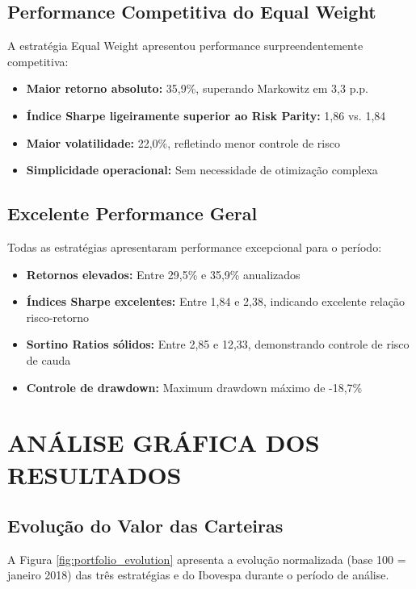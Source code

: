 \subsection{Performance Competitiva do Equal Weight}

A estratégia Equal Weight apresentou performance surpreendentemente competitiva:

\begin{itemize}
    \item \textbf{Maior retorno absoluto:} 35,9\%, superando Markowitz em 3,3 p.p.
    \item \textbf{Índice Sharpe ligeiramente superior ao Risk Parity:} 1,86 vs. 1,84
    \item \textbf{Maior volatilidade:} 22,0\%, refletindo menor controle de risco
    \item \textbf{Simplicidade operacional:} Sem necessidade de otimização complexa
\end{itemize}

\subsection{Excelente Performance Geral}

Todas as estratégias apresentaram performance excepcional para o período:

\begin{itemize}
    \item \textbf{Retornos elevados:} Entre 29,5\% e 35,9\% anualizados
    \item \textbf{Índices Sharpe excelentes:} Entre 1,84 e 2,38, indicando excelente relação risco-retorno  
    \item \textbf{Sortino Ratios sólidos:} Entre 2,85 e 12,33, demonstrando controle de risco de cauda
    \item \textbf{Controle de drawdown:} Maximum drawdown máximo de -18,7\%
\end{itemize}

\section{ANÁLISE GRÁFICA DOS RESULTADOS}

\subsection{Evolução do Valor das Carteiras}

A Figura \ref{fig:portfolio_evolution} apresenta a evolução normalizada (base 100 = janeiro 2018) das três estratégias e do Ibovespa durante o período de análise.

